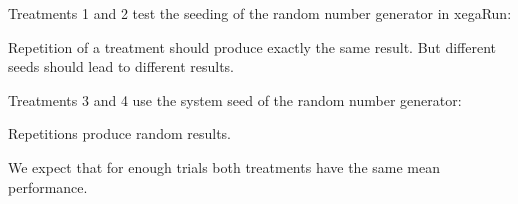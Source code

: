 \begin{frame}
\vspace*{2mm}
\begin{block}{

}
Treatments 1 and 2 test the seeding of the random number generator in xegaRun:
 
Repetition of a treatment should produce exactly the same result.
But different seeds should lead to different results.
 
Treatments 3 and 4 use the system seed of the random number generator:
 
Repetitions produce random results.
 
We expect that for enough trials both treatments have the same mean performance.
\end{block}
\end{frame}